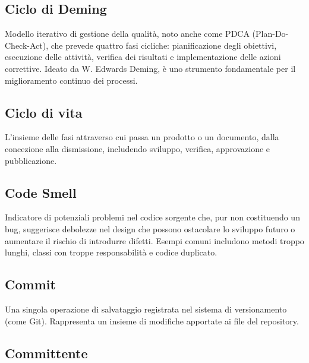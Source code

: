 \documentclass[a4paper, 11pt, oneside]{scrartcl} %
\begin{document}
\subsection*{Ciclo di Deming}
Modello iterativo di gestione della qualità, noto anche come PDCA (Plan-Do-Check-Act), che prevede quattro fasi cicliche: pianificazione degli obiettivi, esecuzione delle attività, verifica dei risultati e implementazione delle azioni correttive. Ideato da W. Edwards Deming, è uno strumento fondamentale per il miglioramento continuo dei processi.
\vspace{0.5cm}

\subsection*{Ciclo di vita}


L'insieme delle fasi attraverso cui passa un prodotto o un documento, dalla concezione alla dismissione, includendo sviluppo, verifica, approvazione e pubblicazione.

\vspace{0.5cm}

\subsection*{Code Smell}
Indicatore di potenziali problemi nel codice sorgente che, pur non costituendo un bug, suggerisce debolezze nel design che possono ostacolare lo sviluppo futuro o aumentare il rischio di introdurre difetti. Esempi comuni includono metodi troppo lunghi, classi con troppe responsabilità e codice duplicato.
\vspace{0.5cm}

\subsection*{Commit}


Una singola operazione di salvataggio registrata nel sistema di versionamento (come Git). Rappresenta un insieme di modifiche apportate ai file del repository.

\vspace{0.5cm}

\subsection*{Committente}
\end{document}
